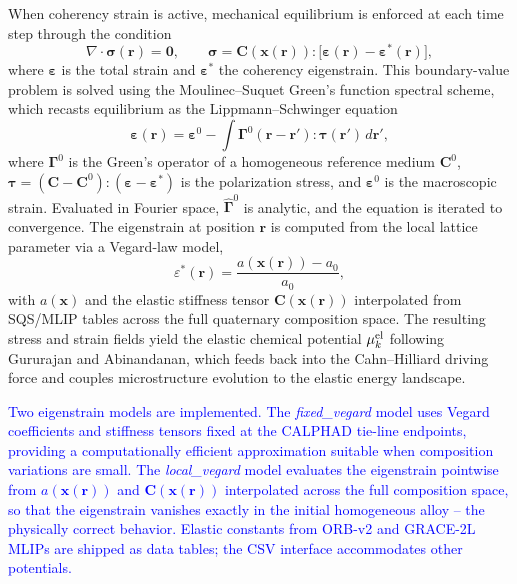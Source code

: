 \documentclass[12pt]{article}
\begin{document}
When coherency strain is active, mechanical equilibrium is enforced at each time step through the condition
\begin{equation}
  \nabla \cdot \boldsymbol{\sigma}(\mathbf{r}) = \mathbf{0}, \qquad
  \boldsymbol{\sigma} = \mathbf{C}(\mathbf{x}(\mathbf{r})) : \bigl[\boldsymbol{\varepsilon}(\mathbf{r}) - \boldsymbol{\varepsilon}^*(\mathbf{r})\bigr],
\end{equation}
where $\boldsymbol{\varepsilon}$ is the total strain and $\boldsymbol{\varepsilon}^*$ the coherency eigenstrain. This boundary-value problem is solved using the Moulinec--Suquet Green's function spectral scheme,\cite{moulinec1998numerical} which recasts equilibrium as the Lippmann--Schwinger equation
\begin{equation}
  \boldsymbol{\varepsilon}(\mathbf{r}) = \boldsymbol{\varepsilon}^0 - \int \boldsymbol{\Gamma}^0(\mathbf{r}-\mathbf{r}'): \boldsymbol{\tau}(\mathbf{r}')\,d\mathbf{r}',
\end{equation}
where $\boldsymbol{\Gamma}^0$ is the Green's operator of a homogeneous reference medium $\mathbf{C}^0$, $\boldsymbol{\tau} = (\mathbf{C} - \mathbf{C}^0):(\boldsymbol{\varepsilon} - \boldsymbol{\varepsilon}^*)$ is the polarization stress, and $\boldsymbol{\varepsilon}^0$ is the macroscopic strain. Evaluated in Fourier space, $\hat{\boldsymbol{\Gamma}}^0$ is analytic, and the equation is iterated to convergence. The eigenstrain at position $\mathbf{r}$ is computed from the local lattice parameter via a Vegard-law model,
\begin{equation}
  \varepsilon^*(\mathbf{r}) = \frac{a(\mathbf{x}(\mathbf{r})) - a_0}{a_0},
\end{equation}
with $a(\mathbf{x})$ and the elastic stiffness tensor $\mathbf{C}(\mathbf{x}(\mathbf{r}))$ interpolated from SQS/MLIP tables across the full quaternary composition space.\cite{zunger1990special} The resulting stress and strain fields yield the elastic chemical potential $\mu_k^{\rm el}$ following Gururajan and Abinandanan,\cite{gururajan2007phase} which feeds back into the Cahn--Hilliard driving force and couples microstructure evolution to the elastic energy landscape.

\textcolor{blue}{Two eigenstrain models are implemented. The \emph{fixed\_vegard} model uses Vegard coefficients and stiffness tensors fixed at the CALPHAD tie-line endpoints, providing a computationally efficient approximation suitable when composition variations are small. The \emph{local\_vegard} model evaluates the eigenstrain pointwise from $a(\mathbf{x}(\mathbf{r}))$ and $\mathbf{C}(\mathbf{x}(\mathbf{r}))$ interpolated across the full composition space, so that the eigenstrain vanishes exactly in the initial homogeneous alloy -- the physically correct behavior. Elastic constants from ORB-v2 and GRACE-2L MLIPs are shipped as data tables; the CSV interface accommodates other potentials.}
\end{document}
